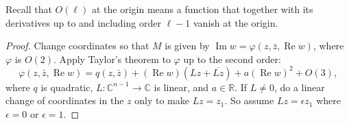 \documentclass[12pt,openany]{book}
\renewcommand{\Re}{\operatorname{Re}}
\renewcommand{\Im}{\operatorname{Im}}
\newcommand{\C}{{\mathbb{C}}}
\newcommand{\R}{{\mathbb{R}}}
\theoremstyle{plain}
\theoremstyle{remark}
\theoremstyle{definition}
\theoremstyle{exercise}
\theoremstyle{example}
\begin{document}
Recall that $O(\ell)$ at the origin means
a function that together with its derivatives up to and including
order $\ell-1$ vanish at the origin.

\begin{proof}
Change coordinates so that $M$ is given by
$\Im w = \varphi(z,\bar{z},\Re w)$,  where $\varphi$ is $O(2)$.
Apply Taylor's theorem to $\varphi$ up to the second order:
\begin{equation*}
\varphi(z,\bar{z},\Re w) = q(z,\bar{z}) + (\Re w) (Lz + \overline{Lz}) +
a {(\Re w)}^2 +
O(3) ,
\end{equation*}
where $q$ is quadratic, $L \colon \C^{n-1} \to \C$ is linear, and $a \in \R$.
If $L \not= 0$,
do a linear change of coordinates in the $z$ only to make $Lz = z_1$.
So assume $Lz = \epsilon z_1$ where $\epsilon = 0$ or $\epsilon = 1$.


\end{proof}
\end{document}
